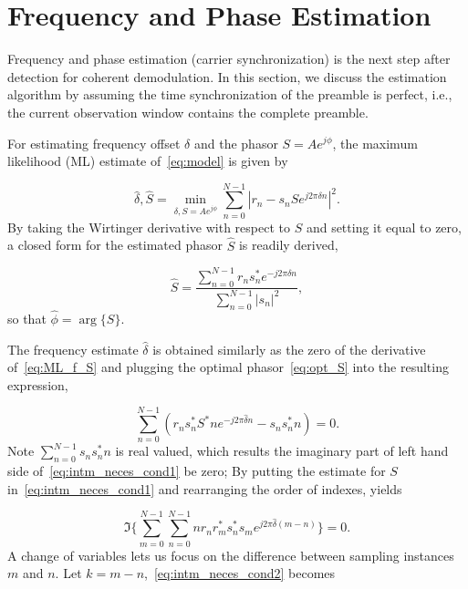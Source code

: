 \section{Frequency and Phase Estimation}%
\label{sec:freq_est}

Frequency and phase estimation (carrier synchronization) is the next step after detection for coherent demodulation.
In this section, we discuss the estimation algorithm by assuming the time synchronization of the preamble is perfect, i.e., 
the current observation window contains the complete preamble.

For estimating frequency offset $\delta$ and the phasor $S=Ae^{j\phi}$, the maximum likelihood (ML) estimate of~\eqref{eq:model} is given by

\begin{equation}
\label{eq:ML_f_S}
  \hat{\delta},\hat{S}=\min_{\delta,S=Ae^{j\phi}}\sum_{n=0}^{N-1}|r_n-s_nSe^{j2\pi\delta n}|^{2}.
\end{equation}
By taking the Wirtinger derivative with respect to $S$ and setting it equal to zero, a 
closed form for the estimated phasor $\hat{S}$ is readily derived,

\begin{equation}
    \label{eq:opt_S}
    \hat{S}=\frac{\sum_{n=0}^{N-1}{r_{n}s_n^{*}e^{-j2\pi\delta n}}}{\sum_{n=0}^{N-1}|s_{n}|^2},
  \end{equation}
so that $\hat{\phi}=\arg\{S\}$.

The frequency estimate $\hat{\delta}$ is obtained similarly as the zero of the
derivative of~\eqref{eq:ML_f_S} and plugging the optimal
phasor~\eqref{eq:opt_S} into the resulting expression,

\begin{equation}
    \label{eq:intm_neces_cond1}
    \sum_{n=0}^{N-1}{(r_{n}s_n^{*}S^{*}ne^{-j2\pi \hat{\delta} n}-s_ns_n^{*}n)=0}.
    \end{equation}
Note $\sum_{n=0}^{N-1}{s_ns_n^{*}n}$ is real
valued, which results the imaginary part of left hand side of~\eqref{eq:intm_neces_cond1} be zero;
By putting the estimate for $S$ in~\eqref{eq:intm_neces_cond1} and rearranging the order of indexes, yields

\begin{equation}
    \label{eq:intm_neces_cond2}
    \Im\bigg\{\sum_{m=0}^{N-1}{\sum_{n=0}^{N-1}{nr_{n}r_{m}^{*}s_n^{*}s_me^{j2\pi\hat{\delta}(m-n)}}}\bigg\} = 0.
  \end{equation}
A change of variables lets us focus on the difference between sampling instances $m$ and $n$.
Let $k=m-n$,~\eqref{eq:intm_neces_cond2} becomes

